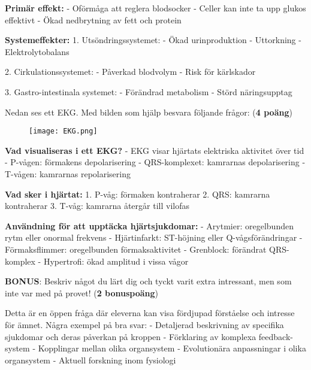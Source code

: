 \documentclass{exam}
\begin{document}
\begin{questions}
\begin{solution}
\textbf{Primär effekt:}
- Oförmåga att reglera blodsocker
- Celler kan inte ta upp glukos effektivt
- Ökad nedbrytning av fett och protein

\textbf{Systemeffekter:}
1. Utsöndringssystemet:
   - Ökad urinproduktion
   - Uttorkning
   - Elektrolytobalans

2. Cirkulationssystemet:
   - Påverkad blodvolym
   - Risk för kärlskador

3. Gastro-intestinala systemet:
   - Förändrad metabolism
   - Störd näringsupptag
\end{solution}

\question Nedan ses ett EKG. Med bilden som hjälp besvara följande frågor: (\textbf{4 poäng})
\begin{figure}[h]
\centering
\texttt{[image: EKG.png]}
\end{figure}

\begin{solution}
\textbf{Vad visualiseras i ett EKG?}
- EKG visar hjärtats elektriska aktivitet över tid
- P-vågen: förmakens depolarisering
- QRS-komplexet: kamrarnas depolarisering
- T-vågen: kamrarnas repolarisering

\textbf{Vad sker i hjärtat:}
1. P-våg: förmaken kontraherar
2. QRS: kamrarna kontraherar
3. T-våg: kamrarna återgår till vilofas

\textbf{Användning för att upptäcka hjärtsjukdomar:}
- Arytmier: oregelbunden rytm eller onormal frekvens
- Hjärtinfarkt: ST-höjning eller Q-vågsförändringar
- Förmaksflimmer: oregelbunden förmaksaktivitet
- Grenblock: förändrat QRS-komplex
- Hypertrofi: ökad amplitud i vissa vågor
\end{solution}

\question \textbf{BONUS}: Beskriv något du lärt dig och tyckt varit extra intressant, men som inte var med på provet! (\textbf{2 bonuspoäng})
\begin{solution}
Detta är en öppen fråga där eleverna kan visa fördjupad förståelse och intresse för ämnet. Några exempel på bra svar:
- Detaljerad beskrivning av specifika sjukdomar och deras påverkan på kroppen
- Förklaring av komplexa feedback-system
- Kopplingar mellan olika organsystem
- Evolutionära anpassningar i olika organsystem
- Aktuell forskning inom fysiologi
\end{solution}

\end{questions}
\end{document}
